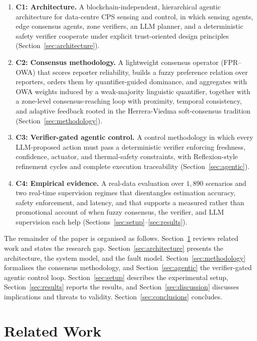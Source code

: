 \documentclass[preprint,11pt]{elsarticle}
\begin{document}
\begin{enumerate}
\item \textbf{C1: Architecture.} A blockchain-independent, hierarchical
agentic architecture for data-centre CPS sensing and control, in which
sensing agents, edge consensus agents, zone verifiers, an LLM planner,
and a deterministic safety verifier cooperate under explicit
trust-oriented design principles (Section~\ref{sec:architecture}).
\item \textbf{C2: Consensus methodology.} A lightweight consensus
operator (FPR--OWA) that scores reporter reliability, builds a fuzzy
preference relation over reporters, orders them by quantifier-guided
dominance, and aggregates with OWA weights induced by a weak-majority
linguistic quantifier, together with a zone-level consensus-reaching
loop with proximity, temporal consistency, and adaptive feedback rooted
in the Herrera-Viedma soft-consensus tradition
(Section~\ref{sec:methodology}).
\item \textbf{C3: Verifier-gated agentic control.} A control
methodology in which every LLM-proposed action must pass a
deterministic verifier enforcing freshness, confidence, actuator, and
thermal-safety constraints, with Reflexion-style refinement cycles and
complete execution traceability
(Section~\ref{sec:agentic}).
\item \textbf{C4: Empirical evidence.} A real-data evaluation over
$1{,}890$ scenarios and two real-time supervision regimes that
disentangles estimation accuracy, safety enforcement, and latency, and
that supports a measured rather than promotional account of when fuzzy
consensus, the verifier, and LLM supervision each help
(Sections~\ref{sec:setup}--\ref{sec:results}).
\end{enumerate}

The remainder of the paper is organised as follows.
Section~\ref{sec:related} reviews related work and states the research
gap. Section~\ref{sec:architecture} presents the architecture, the
system model, and the fault model. Section~\ref{sec:methodology}
formalises the consensus methodology, and Section~\ref{sec:agentic} the
verifier-gated agentic control loop. Section~\ref{sec:setup} describes
the experimental setup, Section~\ref{sec:results} reports the results,
and Section~\ref{sec:discussion} discusses implications and threats to
validity. Section~\ref{sec:conclusions} concludes.

\section{Related Work}
\label{sec:related}
\end{document}
